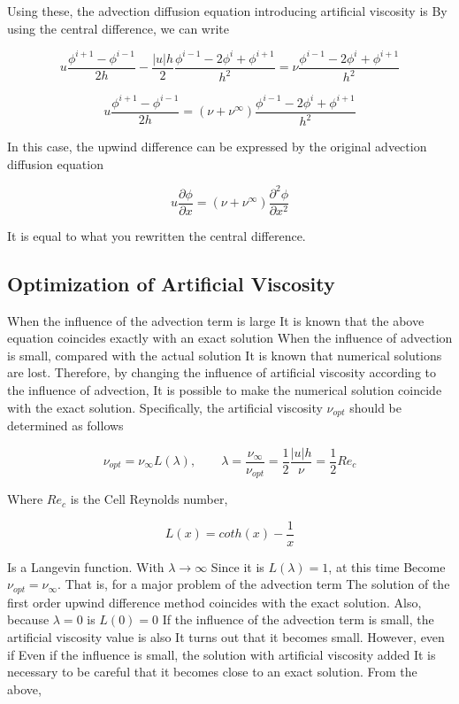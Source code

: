 Using these, the advection diffusion equation introducing artificial viscosity is
By using the central difference, we can write

\begin{equation}
u\frac{\phi^{i+1}-\phi^{i-1}}{2h} - \frac{|u|h}{2}\frac{\phi^{i-1}-2\phi^i+\phi^{i+1}}{h^2} = \nu\frac{\phi^{i-1}-2\phi^i+\phi^{i+1}}{h^2}
\end{equation}


\begin{equation}
u\frac{\phi^{i+1}-\phi^{i-1}}{2h} = (\nu+\nu^{\infty})\frac{\phi^{i-1}-2\phi^i+\phi^{i+1}}{h^2}
\end{equation}

In this case, the upwind difference can be expressed by the original advection diffusion equation

\begin{equation}
u\frac{\partial\phi}{\partial x} = (\nu+\nu^{\infty})\frac{\partial^2\phi}{\partial x^2}
\end{equation}

It is equal to what you rewritten the central difference.



\subsection{Optimization of Artificial Viscosity}

When the influence of the advection term is large
It is known that the above equation coincides exactly with an exact solution
When the influence of advection is small, compared with the actual solution
It is known that numerical solutions are lost.
Therefore, by changing the influence of artificial viscosity according to the influence of advection,
It is possible to make the numerical solution coincide with the exact solution.
Specifically, the artificial viscosity $\nu_{opt}$ should be determined as follows

\begin{equation}
\nu_{opt} = \nu_{\infty} L(\lambda), \qquad \lambda=\frac{\nu_{\infty}}{\nu_{opt}} = \frac{1}{2}\frac{|u|h}{\nu}=\frac{1}{2}Re_c
\end{equation}

Where $Re_c$ is the Cell Reynolds number,

\begin{equation}
L(x) = coth(x)-\frac{1}{x}
\end{equation}

Is a Langevin function.
With $\lambda \rightarrow {\infty}$
Since it is $L(\lambda)=1$, at this time
Become $\nu_{opt}=\nu_{\infty}$.
That is, for a major problem of the advection term
The solution of the first order upwind difference method coincides with the exact solution.
Also, because $\lambda=0$ is $L(0)=0$
If the influence of the advection term is small, the artificial viscosity value is also
It turns out that it becomes small. However, even if
Even if the influence is small, the solution with artificial viscosity added
It is necessary to be careful that it becomes close to an exact solution.
From the above,

